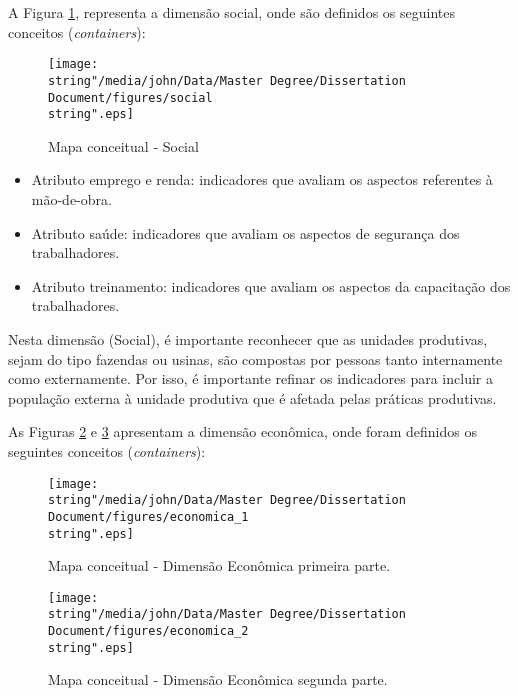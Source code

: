 A Figura \ref{fig:social}, representa a dimensão social, onde são
definidos os seguintes conceitos (\emph{containers}):

\begin{figure}
\centering{}\texttt{[image: \\string"/media/john/Data/Master Degree/Dissertation Document/figures/social\\string".eps]}\caption{Mapa conceitual - Social\label{fig:social}}
\end{figure}

\begin{itemize}
\item Atributo emprego e renda: indicadores que avaliam os aspectos referentes
à mão-de-obra.
\item Atributo saúde: indicadores que avaliam os aspectos de segurança dos
trabalhadores.
\item Atributo treinamento: indicadores que avaliam os aspectos da capacitação
dos trabalhadores.
\end{itemize}
Nesta dimensão (Social), é importante reconhecer que as unidades produtivas,
sejam do tipo fazendas ou usinas, são compostas por pessoas tanto
internamente como externamente. Por isso, é importante refinar os
indicadores para incluir a população externa à unidade produtiva que
é afetada pelas práticas produtivas.

As Figuras \ref{fig:Economic-1} e \ref{fig:Economic-2} apresentam
a dimensão econômica, onde foram definidos os seguintes conceitos
(\emph{containers}):

\begin{figure}
\begin{centering}
\texttt{[image: \\string"/media/john/Data/Master Degree/Dissertation Document/figures/economica\_1\\string".eps]}
\par\end{centering}
\caption{Mapa conceitual - Dimensão Econômica primeira parte.\label{fig:Economic-1}}
\end{figure}

\begin{figure}
\begin{centering}
\texttt{[image: \\string"/media/john/Data/Master Degree/Dissertation Document/figures/economica\_2\\string".eps]}
\par\end{centering}
\caption{Mapa conceitual - Dimensão Econômica segunda parte.\label{fig:Economic-2}}
\end{figure}

